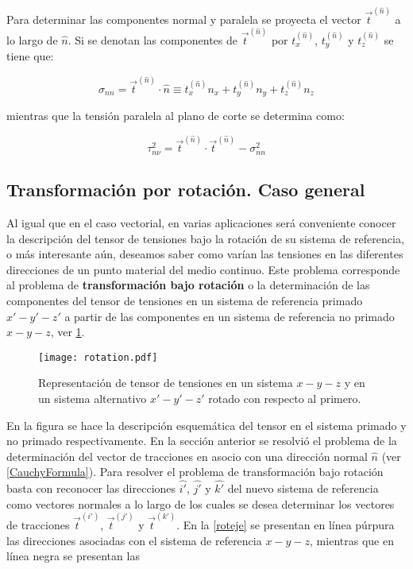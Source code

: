 \documentclass[../notas medios.tex]{subfiles}
\begin{document}
Para determinar las componentes normal y paralela se proyecta el vector ${{\vec t}^{(\hat n)}}$ a lo largo de $\hat{n}$. Si se denotan las componentes de ${{\vec t}^{(\hat n)}}$ por $t_x^{(\hat n)}$, $t_y^{(\hat n)}$  y $t_z^{(\hat n)}$  se tiene que:

\[{\sigma _{nn}} = {{\vec t}^{(\hat n)}} \cdot \hat n \equiv t_x^{(\hat n)}{n_x} + t_y^{(\hat n)}{n_y} + t_z^{(\hat n)}{n_z}\]

mientras que la tensión paralela al plano de corte se determina como:

\[\tau _{n\nu }^2 = {{\vec t}^{(\hat n)}} \cdot {{\vec t}^{(\hat n)}} - \sigma _{nn}^2\]


\subsection{Transformación por rotación. Caso general}

Al igual que en el caso vectorial, en varias aplicaciones será conveniente conocer la descripción del tensor de tensiones bajo la rotación de su
sistema de referencia, o más interesante aún, deseamos saber como varían las tensiones en las diferentes direcciones de un punto material del medio continuo. Este problema corresponde al problema de {\bf transformación bajo rotación} o la determinación de las componentes del tensor de tensiones en un sistema de referencia primado $x'-y'-z'$ a partir de las componentes en un sistema de referencia no primado $x-y-z$, ver \cref{rotation}. 


\begin{figure}[H]
\centering
	\texttt{[image: rotation.pdf]}
	\caption{Representación de tensor de tensiones en un sistema $x-y-z$ y en un sistema alternativo $x'-y'-z'$ rotado con respecto al primero.}
	\label{rotation}
\end{figure}

En la figura se hace la descripción esquemática del tensor en el sistema 
primado y no primado respectivamente. En la sección anterior se resolvió el 
problema de la determinación del vector de tracciones en asocio con una 
dirección normal $\hat{n}$ (ver \cref{CauchyFormula}). Para resolver el 
problema de transformación bajo rotación basta con reconocer las direcciones 
$\hat{i'}$, $\hat{j'}$ y $\hat{k'}$  del nuevo sistema de referencia como 
vectores normales a lo largo de los cuales se desea determinar los vectores de 
tracciones ${\vec t^{(i')}}$, ${\vec t^{(j')}}$ y ${\vec t^{(k')}}$. En la 
\cref{roteje} se presentan en línea púrpura las direcciones asociadas con el 
sistema de referencia $x-y-z$, mientras que en línea negra se presentan las
 
\end{document}

